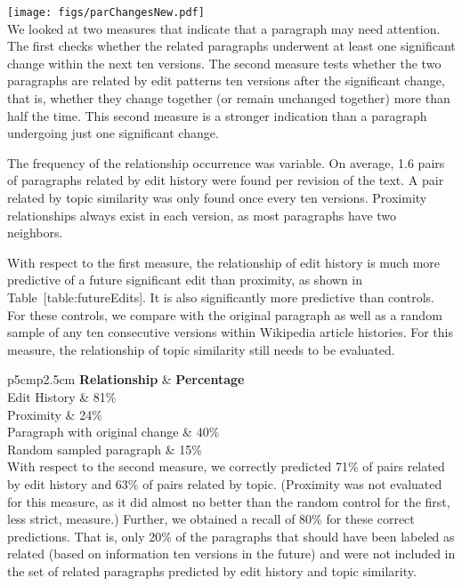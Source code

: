 \texttt{[image: figs/parChangesNew.pdf]}\\

We looked at two measures that indicate that a paragraph may need
attention. The first checks whether the related paragraphs underwent at
least one significant change within the next ten versions. The second
measure tests whether the two paragraphs are related by edit patterns
ten versions after the significant change, that is, whether they change
together (or remain unchanged together) more than half the time. This
second measure is a stronger indication than a paragraph undergoing just
one significant change.

The frequency of the relationship occurrence was variable. On average,
1.6 pairs of paragraphs related by edit history were found per revision
of the text. A pair related by topic similarity was only found once
every ten versions. Proximity relationships always exist in each
version, as most paragraphs have two neighbors.

With respect to the first measure, the relationship of edit history is
much more predictive of a future significant edit than proximity, as
shown in Table~{[}table:futureEdits{]}. It is also significantly more
predictive than controls. For these controls, we compare with the
original paragraph as well as a random sample of any ten consecutive
versions within Wikipedia article histories. For this measure, the
relationship of topic similarity still needs to be evaluated.

{\textbar{}p{5cm}\textbar{}p{2.5cm}\textbar{}} \textbf{Relationship} \&
\textbf{Percentage}\\Edit History \& 81\%\\

Proximity \& 24\%\\

Paragraph with original change \& 40\%\\

Random sampled paragraph \& 15\%\\

With respect to the second measure, we correctly predicted 71\% of pairs
related by edit history and 63\% of pairs related by topic. (Proximity
was not evaluated for this measure, as it did almost no better than the
random control for the first, less strict, measure.) Further, we
obtained a recall of 80\% for these correct predictions. That is, only
20\% of the paragraphs that should have been labeled as related (based
on information ten versions in the future) and were not included in the
set of related paragraphs predicted by edit history and topic
similarity.

